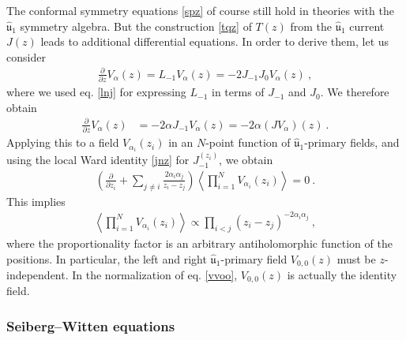\documentclass[12pt, a4paper, notitlepage, twoside]{report}
\numberwithin{equation}{section}
\theoremstyle{break}
\begin{document}
The conformal symmetry equations \eqref{spz} of course still hold in theories with the $\hat{\mathfrak{u}}_1$ symmetry algebra.
But the construction \eqref{tqz} of $T(z)$ from the $\hat{\mathfrak{u}}_1$ current $J(z)$ leads to additional differential equations.
In order to derive them, let us consider 
\begin{align}
 {\frac{\partial}{\partial z}} V_{\alpha}(z) = L_{-1}V_\alpha(z) = -2J_{-1}J_0 V_\alpha(z)\ ,
\end{align}
where we used eq. \eqref{lnj} for expressing $L_{-1}$ in terms of $J_{-1}$ and $J_0$.
We therefore obtain
\begin{align}
{\frac{\partial}{\partial z}} V_{\alpha}(z)&= -2\alpha J_{-1}V_\alpha(z) = -2\alpha(JV_\alpha)(z)\ .
\label{pvaj}
\end{align}
Applying this to a field $V_{\alpha_i}(z_i)$ in an 
$N$-point function of $\hat{\mathfrak{u}}_1$-primary fields, and using 
the local Ward identity \eqref{jnz} for $J_{-1}^{(z_i)}$, we obtain 
\begin{align}
\left( {\frac{\partial}{\partial z_i}} +\sum_{j\neq i} \frac{2\alpha_i\alpha_j}{z_i-z_j} \right) \left\langle \prod_{i=1}^N V_{\alpha_i}(z_i) \right\rangle = 0 \ .
\label{kzl}
\end{align}
This implies 
\begin{align}
 \boxed{\left\langle \prod_{i=1}^N V_{\alpha_i}(z_i)\right\rangle  \propto \prod_{i<j} (z_i-z_j)^{-2\alpha_i\alpha_j}}\ ,
\label{pzz}
\end{align}
where the proportionality factor is an arbitrary antiholomorphic function of the positions.
In particular, the left and right $\hat{\mathfrak{u}}_1$-primary field $V_{0,0}(z)$ must be $z$-independent.
In the normalization of eq. \eqref{vvoo}, $V_{0,0}(z)$ is actually the identity field.

\subsubsection{Seiberg--Witten equations}
\end{document}

